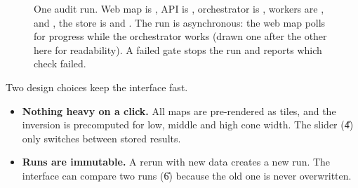 \begin{figure}[H]
\centering
{}
\caption{One audit run. Web map is , API is , orchestrator is , workers are ,
 and , the store is  and . The run is asynchronous: the web map polls for
progress while the orchestrator works (drawn one after the other here for readability). A failed
gate stops the run and reports which check failed.}\label{fig:seq}
\end{figure}

Two design choices keep the interface fast.
\begin{itemize}
\item \textbf{Nothing heavy on a click.} All maps are pre-rendered as tiles, and the inversion is
precomputed for low, middle and high cone width. The slider (\U{4}) only switches between stored
results.
\item \textbf{Runs are immutable.} A rerun with new data creates a new run. The interface can compare
two runs (\U{6}) because the old one is never overwritten.
\end{itemize}

